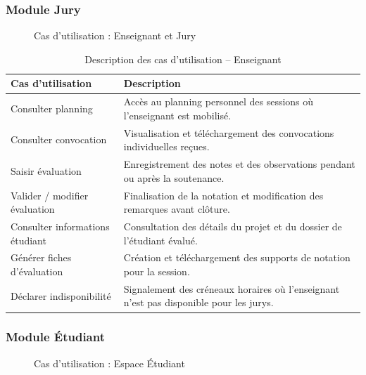 \documentclass[12pt,a4paper]{article}
\begin{document}
\subsubsection{Module Jury}
\begin{figure}[H]
    \centering
    \caption{Cas d'utilisation : Enseignant et Jury}
\end{figure}

\begin{table}[H]
    \centering
    \small
    \begin{tabular}{lp{10cm}}
        \toprule
        \rowcolor{primary!10}
        \textbf{Cas d'utilisation}      & \textbf{Description}                                                                   \\
        \midrule
        Consulter planning              & Accès au planning personnel des sessions où l'enseignant est mobilisé.                 \\
        \addlinespace
        Consulter convocation           & Visualisation et téléchargement des convocations individuelles reçues.                 \\
        \addlinespace
        Saisir évaluation               & Enregistrement des notes et des observations pendant ou après la soutenance.           \\
        \addlinespace
        Valider / modifier évaluation   & Finalisation de la notation et modification des remarques avant clôture.               \\
        \addlinespace
        Consulter informations étudiant & Consultation des détails du projet et du dossier de l'étudiant évalué.                 \\
        \addlinespace
        Générer fiches d'évaluation     & Création et téléchargement des supports de notation pour la session.                   \\
        \addlinespace
        Déclarer indisponibilité        & Signalement des créneaux horaires où l'enseignant n'est pas disponible pour les jurys. \\
        \bottomrule
    \end{tabular}
    \caption{Description des cas d'utilisation -- Enseignant}
\end{table}

\subsubsection{Module Étudiant}
\begin{figure}[H]
    \centering
    \caption{Cas d'utilisation : Espace Étudiant}
\end{figure}
\end{document}
